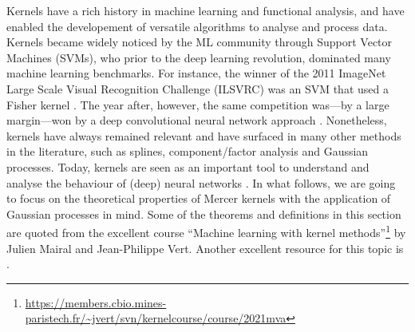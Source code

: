 Kernels have a rich history in machine learning and functional analysis, and have enabled the developement of versatile algorithms to analyse and process data. Kernels became widely noticed by the ML community through Support Vector Machines (SVMs), who prior to the deep learning revolution, dominated many machine learning benchmarks. %
For instance, the winner of the 2011 ImageNet Large Scale Visual Recognition Challenge (ILSVRC) was an SVM that used a Fisher kernel \citep{perronnin2010large}. The year after, however, the same competition was---by a large margin---won by a deep convolutional neural network approach \citep[AlexNet]{alexnet}. Nonetheless, kernels have always remained relevant and have surfaced in many other methods in the literature, such as splines, component/factor analysis and Gaussian processes. Today, kernels are seen as an important tool to understand and analyse the behaviour of (deep) neural networks \citep[e.g.,][]{jacot2018neural}. %
In what follows, we are going to focus on the theoretical properties of Mercer kernels with the application of Gaussian processes in mind. Some of the theorems and definitions in this section are quoted from the excellent course ``Machine learning with kernel methods''\footnote{\url{https://members.cbio.mines-paristech.fr/~jvert/svn/kernelcourse/course/2021mva}} by Julien Mairal and Jean-Philippe Vert. Another excellent resource for this topic is \citet{kanagawa2018gaussian}.

